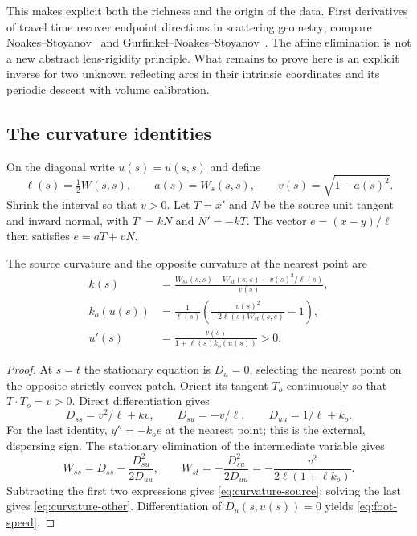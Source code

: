 This makes explicit both the richness and the origin of the data.
First derivatives of travel time recover endpoint directions in
scattering geometry; compare Noakes--Stoyanov~\cite[Lemma 4]{NS} and
Gurfinkel--Noakes--Stoyanov~\cite[Lemma 7]{GNS}. The affine elimination
is not a new abstract lens-rigidity principle. What remains to prove
here is an explicit inverse for two unknown reflecting arcs in their
intrinsic coordinates and its periodic descent with volume calibration.

\subsection{The curvature identities}
On the diagonal write $u(s)=u(s,s)$ and define
\begin{equation}\label{eq:diagonal}
 \ell(s)=\tfrac12W(s,s),\qquad a(s)=W_s(s,s),\qquad
 v(s)=\sqrt{1-a(s)^2}.
\end{equation}
Shrink the interval so that $v>0$. Let $T=x'$ and $N$ be the source
unit tangent and inward normal, with $T'=kN$ and $N'=-kT$.
The vector $e=(x-y)/\ell$ then satisfies $e=aT+vN$.

\begin{lemma}\label{lem:curvature}
The source curvature and the opposite curvature at the nearest point are
\begin{align}
 k(s)&=\frac{W_{ss}(s,s)-W_{st}(s,s)-v(s)^2/\ell(s)}{v(s)},
                                                    \label{eq:curvature-source}\\
 k_o(u(s))&=\frac1{\ell(s)}
       \left(\frac{v(s)^2}{-2\ell(s)W_{st}(s,s)}-1\right),
                                                    \label{eq:curvature-other}\\
 u'(s)&=\frac{v(s)}{1+\ell(s)k_o(u(s))}>0.          \label{eq:foot-speed}
\end{align}
\end{lemma}
\begin{proof}
At $s=t$ the stationary equation is $D_u=0$, selecting the nearest
point on the opposite strictly convex patch. Orient its tangent $T_o$
continuously so that $T\cdot T_o=v>0$. Direct differentiation gives
\[
 D_{ss}=v^2/\ell+kv,\qquad D_{su}=-v/\ell,\qquad
 D_{uu}=1/\ell+k_o.
\]
For the last identity, $y''=-k_oe$ at the nearest point; this is the
external, dispersing sign. The stationary elimination of the intermediate
variable gives
\begin{equation}\label{eq:schur}
 W_{ss}=D_{ss}-\frac{D_{su}^2}{2D_{uu}},\qquad
 W_{st}=-\frac{D_{su}^2}{2D_{uu}}
        =-\frac{v^2}{2\ell(1+\ell k_o)}.
\end{equation}
Subtracting the first two expressions gives
\eqref{eq:curvature-source}; solving the last gives
\eqref{eq:curvature-other}. Differentiation of $D_u(s,u(s))=0$
yields \eqref{eq:foot-speed}.
\end{proof}

